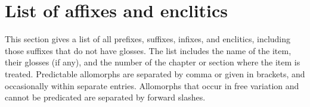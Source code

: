 \chapter{List of affixes and enclitics}
\label{apx:appendix}



\label{apx:List of affixes and enclitics}

This section gives a list of all prefixes, suffixes, infixes, and enclitics, including those suffixes that do not have glosses. The list includes the name of the item, their glosses (if any), and the number of the chapter or section where the item is treated. Predictable allomorphs are separated by comma or given in brackets, and occasionally within separate entries. Allomorphs that occur in free variation and cannot be predicated are separated by forward slashes.
 
